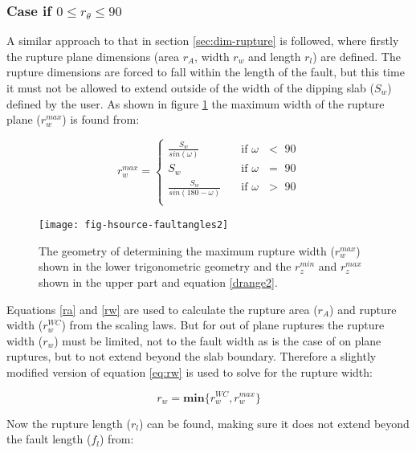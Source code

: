 \subsubsection{Case if  $0 \leq r_\theta \leq 90$} \label{sec:0to90}

A similar approach to that in section \ref{sec:dim-rupture} is followed, where firstly the rupture plane dimensions (area $r_A$, width $r_w$ and length $r_l$) are defined. The rupture dimensions are forced to fall 
within the length of the fault, but this time it must not be allowed to extend outside of the width of the dipping slab ($S_w$) defined by the user. As shown in figure \ref{fig:deltaeq} the 
maximum width of the rupture plane ($r_w^{max}$) is found from:

\begin{equation}\label{rwmax}
r_w^{max} = 
\begin{cases}
 \frac{ S_w }{sin (\omega)}		& \quad \mbox{if $\omega$ $<$ 90} \\
S_w							& \quad \mbox{if $\omega$ $=$ 90} \\
 \frac{ S_w }{sin (180 - \omega ) }	& \quad \mbox{if $\omega$ $>$ 90} \\
\end{cases}
\end{equation}


\begin{figure}[htp]
\centerline{\texttt{[image: fig-hsource-faultangles2]}}
\caption{The geometry of determining the maximum rupture width ($r_w^{max}$) shown in the lower trigonometric geometry and the $r_z^{min}$ and $r_z^{max}$ shown in the upper part and equation \ref{drange2}.}
\label{fig:deltaeq}
\end{figure}

Equations \ref{ra} and \ref{rw} are used to calculate the rupture area ($r_A$) and rupture width ($r_w^{WC}$) from the \citep{eqrm_Wells94} 
scaling laws. But for out of plane ruptures the rupture width ($r_w$) must be limited, not to the fault width as is the case 
of on plane ruptures, but to not extend beyond the slab boundary. Therefore a slightly modified version of 
equation \ref{eq:rw} is used to solve for the rupture width:

\begin{equation} \label{rw090}
r_w = \mathbf{min}\{ r_w^{WC}, r_w^{max}\}
\end{equation}

Now the rupture length ($r_l$) can be found, making sure it does not extend beyond the fault length ($f_l$) from:

